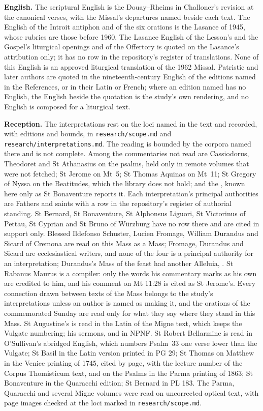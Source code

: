{\textbf{English.} The scriptural English is the Douay--Rheims in Challoner's
revision at the canonical verses, with the Missal's departures named beside
each text. The English of the Introit antiphon and of the six orations is the
Lasance  of 1945, whose rubrics are those before 1960.
The Lasance English of the Lesson's and the Gospel's liturgical openings and of
the Offertory is quoted on the Lasance's attribution only; it has no row in
the repository's register of translations. None of this English is an
approved liturgical translation of the 1962 Missal. Patristic and later
authors are quoted in the nineteenth-century English of the editions named in
the References, or in their Latin or French; where an edition named has no
English, the English beside the quotation is the study's own rendering, and
no English is composed for a liturgical text.

\textbf{Reception.} The interpretations rest on the loci named in the text
and recorded, with editions and bounds, in \texttt{research/scope.md} and
\texttt{research/interpretations.md}. The reading is bounded by the corpora
named there and is not complete. Among the commentaries not read are
Cassiodorus, Theodoret and St Athanasius on the psalms, held only in remote
volumes that were not fetched; St Jerome on Mt~5; St Thomas Aquinas on Mt~11;
St Gregory of Nyssa on the Beatitudes, which the library does not hold; and
the , known here only as St Bonaventure reports it.
Each interpretation's principal authorities are Fathers and saints with a row
in the repository's register of authorial standing. St Bernard, St
Bonaventure, St Alphonsus Liguori, St Victorinus of Pettau, St Cyprian and St
Bruno of Würzburg have no row there and are cited in support only. Blessed
Ildefonso Schuster, Lucien Fromage, William Durandus and Sicard of Cremona are
read on this Mass as a Mass; Fromage, Durandus and Sicard are ecclesiastical
writers, and none of the four is a principal authority for an
interpretation; Durandus's Mass of the feast had another Alleluia,
. St Rabanus Maurus is a compiler: only the words his commentary
marks as his own are credited to him, and his comment on Mt 11:28 is cited as
St Jerome's. Every connection drawn between texts of the Mass belongs to the
study's interpretations unless an author is named as making it, and the
orations of the commemorated Sunday are read only for what they say where they
stand in this Mass. St Augustine's  is read in the Latin of
the Migne text, which keeps the Vulgate numbering; his sermons,  and  in NPNF. St Robert Bellarmine
is read in O'Sullivan's abridged English, which numbers Psalm~33 one verse
lower than the Vulgate; St Basil in the Latin version printed in PG 29; St
Thomas on Matthew in the Venice printing of 1745, cited by page, with the
lecture number of the Corpus Thomisticum text, and on the Psalms in the Parma
printing of 1863; St Bonaventure in the Quaracchi edition; St Bernard in PL
183. The Parma, Quaracchi and several Migne volumes were read on uncorrected
optical text, with page images checked at the loci marked in
\texttt{research/scope.md}.

}
